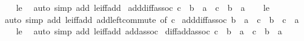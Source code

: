 \begin{isabellebody}
\ \ %
\endisadelimproof
%
\isatagproof
{}\isamarkupfalse%
\ le\ \isamarkupfalse%
\ {\isacharparenleft}{\kern0pt}auto\ simp\ add{\isacharcolon}{\kern0pt}\ le{\isacharunderscore}{\kern0pt}iff{\isacharunderscore}{\kern0pt}add{\isacharparenright}{\kern0pt}%
\endisatagproof
{\isafoldproof}%
%
\isadelimproof
\isanewline
%
\endisadelimproof
\isanewline
{}\isamarkupfalse%
\ add{\isacharunderscore}{\kern0pt}diff{\isacharunderscore}{\kern0pt}assoc{\isacharcolon}{\kern0pt}\ {\isachardoublequoteopen}c\ {\isacharplus}{\kern0pt}\ {\isacharparenleft}{\kern0pt}b\ {\isacharminus}{\kern0pt}\ a{\isacharparenright}{\kern0pt}\ {\isacharequal}{\kern0pt}\ c\ {\isacharplus}{\kern0pt}\ b\ {\isacharminus}{\kern0pt}\ a{\isachardoublequoteclose}\isanewline
%
\isadelimproof
\ \ %
\endisadelimproof
%
\isatagproof
{}\isamarkupfalse%
\ le\ \isamarkupfalse%
\ {\isacharparenleft}{\kern0pt}auto\ simp\ add{\isacharcolon}{\kern0pt}\ le{\isacharunderscore}{\kern0pt}iff{\isacharunderscore}{\kern0pt}add\ add{\isachardot}{\kern0pt}left{\isacharunderscore}{\kern0pt}commute\ {\isacharbrackleft}{\kern0pt}of\ c{\isacharbrackright}{\kern0pt}{\isacharparenright}{\kern0pt}%
\endisatagproof
{\isafoldproof}%
%
\isadelimproof
\isanewline
%
\endisadelimproof
\isanewline
{}\isamarkupfalse%
\ add{\isacharunderscore}{\kern0pt}diff{\isacharunderscore}{\kern0pt}assoc{}{\isacharcolon}{\kern0pt}\ {\isachardoublequoteopen}b\ {\isacharminus}{\kern0pt}\ a\ {\isacharplus}{\kern0pt}\ c\ {\isacharequal}{\kern0pt}\ b\ {\isacharplus}{\kern0pt}\ c\ {\isacharminus}{\kern0pt}\ a{\isachardoublequoteclose}\isanewline
%
\isadelimproof
\ \ %
\endisadelimproof
%
\isatagproof
{}\isamarkupfalse%
\ le\ \isamarkupfalse%
\ {\isacharparenleft}{\kern0pt}auto\ simp\ add{\isacharcolon}{\kern0pt}\ le{\isacharunderscore}{\kern0pt}iff{\isacharunderscore}{\kern0pt}add\ add{\isachardot}{\kern0pt}assoc{\isacharparenright}{\kern0pt}%
\endisatagproof
{\isafoldproof}%
%
\isadelimproof
\isanewline
%
\endisadelimproof
\isanewline
{}\isamarkupfalse%
\ diff{\isacharunderscore}{\kern0pt}add{\isacharunderscore}{\kern0pt}assoc{\isacharcolon}{\kern0pt}\ {\isachardoublequoteopen}c\ {\isacharplus}{\kern0pt}\ b\ {\isacharminus}{\kern0pt}\ a\ {\isacharequal}{\kern0pt}\ c\ {\isacharplus}{\kern0pt}\ {\isacharparenleft}{\kern0pt}b\ {\isacharminus}{\kern0pt}\ a{\isacharparenright}{\kern0pt}{\isachardoublequoteclose}\isanewline
%
\isadelimproof
\ \ %
\endisadelimproof
%
\isatagproof
{}\isamarkupfalse%

\end{isabellebody}
